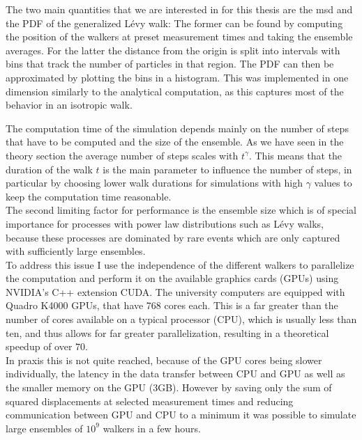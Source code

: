 The two main quantities that we are interested in for this thesis are the \gls{msd} and the \gls{PDF} of the generalized L\'evy walk: The former can be found by computing the position of the walkers at preset measurement times and taking the ensemble averages. For the latter the distance from the origin is split into intervals with bins that track the number of particles in that region. The \gls{PDF} can then be approximated by plotting the bins in a histogram. This was implemented in one dimension similarly to the analytical computation, as this captures most of the behavior in an isotropic walk. 

The computation time of the simulation depends mainly on the number of steps that have to be computed and the size of the ensemble. As we have seen in the theory section the average number of steps scales with $t^{\gamma}$. This means that the duration of the walk $t$ is the main parameter to influence the number of steps, in particular by choosing lower walk durations for simulations with high $\gamma$ values to keep the computation time reasonable.\\
The second limiting factor for performance is the ensemble size which is of special importance for processes with power law distributions such as L\'evy walks, because these processes are dominated by rare events which are only captured with sufficiently large ensembles. \\
To address this issue I use the independence of the different walkers to parallelize the computation and perform it on the available graphics cards (GPUs) using NVIDIA's C++ extension CUDA. The university computers are equipped with Quadro K4000 GPUs, that have 768 cores each. This is a far greater than the number of cores available on a typical processor (CPU), which is usually less than ten, and thus allows for far greater parallelization, resulting in a theoretical speedup of over $70$. \\
In praxis this is not quite reached, because of the GPU cores being slower individually, the latency in the data transfer between CPU and GPU as well as the smaller memory on the GPU (3GB). However by saving only the sum of squared displacements at selected measurement times and reducing communication between GPU and CPU to a minimum it was possible to simulate large ensembles of $10^9$ walkers in a few hours. 

